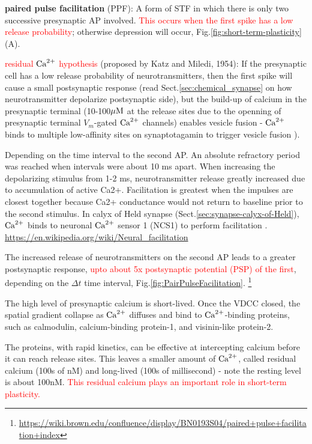 \begin{mdframed}

{\bf paired pulse facilitation} (PPF):  A form of STF in which there is
only two successive presynaptic AP involved. \textcolor{red}{This occurs when
the first spike has a low release probability}; otherwise depression will
occur, Fig.\ref{fig:short-term-plasticity}(A).

\textcolor{red}{residual ${\text{Ca}^{2+}}$ hypothesis} (proposed by Katz and Miledi, 1954):
If the presynaptic cell has a low release probability of neurotransmitters, then
the first spike will cause a small postsynaptic response (read
Sect.\ref{sec:chemical_synapse} on how neurotransmitter depolarize postsynaptic
side), but the build-up of calcium in the presynaptic terminal (10-100${\mu\text{M}}$ at
the release sites  due to the openning of presynaptic terminal $V_m$-gated ${\text{Ca}^{2+}}$
channels) enables vesicle fusion - ${\text{Ca}^{2+}}$ binds to multiple low-affinity sites on
synaptotagamin to trigger vesicle fusion \citep{regehr2012}).

Depending on the time interval to the second AP.
An absolute refractory period was reached when intervals were about 10 ms apart.
When increasing the depolarizing stimulus from 1-2 ms, neurotransmitter release
greatly increased due to accumulation of active Ca2+.
Facilitation is greatest when the impulses are closest together because Ca2+
conductance would not return to baseline prior to the second stimulus.
In  calyx of Held synapse (Sect.\ref{sec:synapse-calyx-of-Held}), ${\text{Ca}^{2+}}$ binds to
neuronal ${\text{Ca}^{2+}}$ sensor 1 (NCS1) to perform facilitation \citep{gomez2001}.
\url{https://en.wikipedia.org/wiki/Neural_facilitation}

The increased release of neurotransmitters on the second AP leads to a greater
postsynaptic response, \textcolor{red}{upto about 5x postsynaptic
potential (PSP) of the first}, depending on the $\Delta t$ time interval,
Fig.\ref{fig:PairPulseFacilitation}.
\footnote{\url{https://wiki.brown.edu/confluence/display/BN0193S04/paired+pulse+facilitation+index}}

The high level of presynaptic calcium is short-lived. Once the VDCC closed, the
spatial gradient collapse as ${\text{Ca}^{2+}}$ diffuses and bind to ${\text{Ca}^{2+}}$-binding proteins,
such as calmodulin, calcium-binding protein-1, and
visinin-like protein-2.

The proteins, with rapid kinetics, can be  effective at intercepting
calcium before it can reach release sites. This leaves a smaller amount of
${\text{Ca}^{2+}}$, called residual calcium (100s of nM) and long-lived (100s of
millisecond) - note the resting level is about 100nM. \textcolor{red}{This
residual calcium plays an important role in short-term plasticity.}

\end{mdframed}



